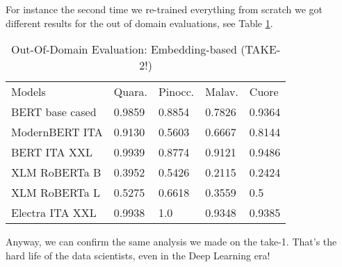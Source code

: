 \documentclass[11pt]{article}
\begin{document}
For instance the second time we re-trained everything from scratch we got different results
for the out of domain evaluations, see Table \ref{t3}.

\begin{table}[]
	\small
	\caption{Out-Of-Domain Evaluation: Embedding-based (TAKE-2!)}
	\begin{tabular}{lllll}
		Models & Quara. & Pinocc. & Malav. & Cuore \\
		BERT base cased & 0.9859      & 0.8854 & 0.7826        & 0.9364                 \\
		ModernBERT ITA  & 0.9130     & 0.5603   & 0.6667   & 0.8144                 \\
		BERT ITA XXL  & 0.9939     & 0.8774  & 0.9121     & 0.9486                 \\
		XLM RoBERTa B & 0.3952      & 0.5426   & 0.2115     & 0.2424                 \\
		XLM RoBERTa L & 0.5275       & 0.6618    & 0.3559   & 0.5               \\
		Electra ITA XXL  & 0.9938      & 1.0   & 0.9348    & 0.9385            
	\end{tabular}
	\label{t3}
\end{table}

Anyway, we can confirm the same analysis we made on the take-1.
That's the hard life of the data scientists, even in the Deep Learning era!


\end{document}
